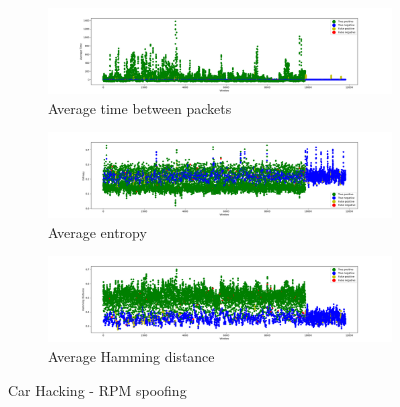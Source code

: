 \begin{figure}
    \centering
    \begin{subfigure}[b]{\linewidth}
        \includegraphics[width = \linewidth]{img/parts/app/tests/car_hacking/rpm/AvgTime.png}
        \caption{Average time between packets}
        \label{subfig:extract_carhacking_rpm_avgtime}
    \end{subfigure}
    \begin{subfigure}[b]{\linewidth}
        \includegraphics[width = \linewidth]{img/parts/app/tests/car_hacking/rpm/Entropy.png}
        \caption{Average entropy}
        \label{subfig:extract_carhacking_rpm_entropy}
    \end{subfigure}
    \begin{subfigure}[b]{\linewidth}
        \includegraphics[width = \linewidth]{img/parts/app/tests/car_hacking/rpm/HammingDist.png}
        \caption{Average Hamming distance}
        \label{subfig:extract_carhacking_rpm_hammingdist}
    \end{subfigure}
    \caption{Car Hacking - RPM spoofing}
    \label{fig:extract_carhacking_rpm}
\end{figure}

